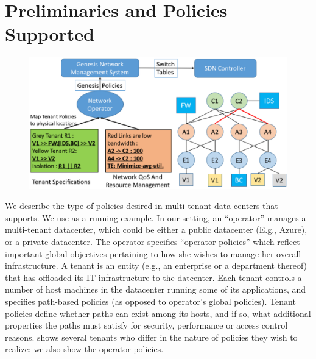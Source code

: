 \section{Preliminaries and Policies Supported}
\begin{figure}
	\includegraphics[width=\columnwidth,center]{figures/architecture.eps}
	\label{fig:architecture}
\end{figure}



We describe the type of policies desired in multi-tenant data centers
that \Name supports. We use  as a running
example. In our setting, an ``operator'' manages a multi-tenant
datacenter, which could be either a public datacenter (E.g., Azure),
or a private datacenter. The operator specifies ``operator policies''
which reflect important global objectives pertaining to how she wishes
to manage her overall infrastructure.
 A tenant is an entity (e.g., an enterprise or a department thereof)
 that has offloaded its IT infrastructure to the datcenter. Each
 tenant controls a number of host machines in the datacenter running
 some of its applications, and specifies path-based policies (as
 opposed to operator's global policies). Tenant policies define
 whether paths can exist among its hosts, and if so, what additional
 properties the paths must satisfy for security, performance or access
 control reasons.  shows several tenants who
 differ in the nature of policies they wish to realize; we also show
 the operator policies.

